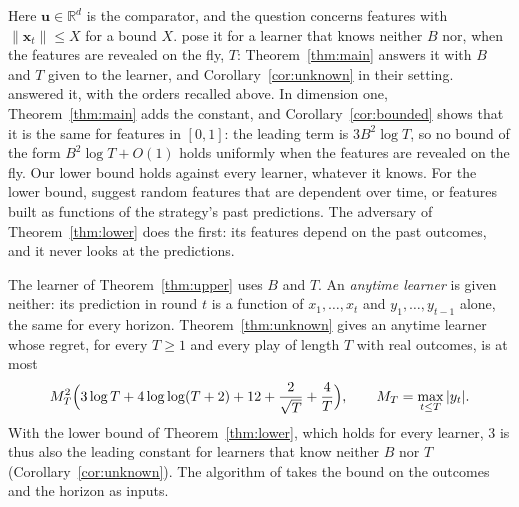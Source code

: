 \documentclass[12pt]{amsart}
\theoremstyle{definition}
\numberwithin{equation}{section}
\newcommand{\R}{\mathbb{R}}
\begin{document}
Here $\mathbf u\in\R^d$ is the comparator, and the question concerns features with $\|\mathbf x_t\|\le X$ for a bound $X$. \citet[Figure~1]{GaillardALT19} pose it for a learner that knows neither $B$ nor, when the features are revealed on the fly, $T$: Theorem~\ref{thm:main} answers it with $B$ and $T$ given to the learner, and Corollary~\ref{cor:unknown} in their setting. \citet[Theorem~5, Proposition~6 and Theorem~7]{CQRZ} answered it, with the orders recalled above. In dimension one, Theorem~\ref{thm:main} adds the constant, and Corollary~\ref{cor:bounded} shows that it is the same for features in $[0,1]$: the leading term is $3B^2\log T$, so no bound of the form $B^2\log T+O(1)$ holds uniformly when the features are revealed on the fly. Our lower bound holds against every learner, whatever it knows. For the lower bound, \citet[Section~4.1]{GaillardALT19} suggest random features that are dependent over time, or features built as functions of the strategy's past predictions. The adversary of Theorem~\ref{thm:lower} does the first: its features depend on the past outcomes, and it never looks at the predictions.

The learner of Theorem~\ref{thm:upper} uses $B$ and $T$. An \emph{anytime learner} is given neither: its prediction in round $t$ is a function of $x_1,\dots,x_t$ and $y_1,\dots,y_{t-1}$ alone, the same for every horizon. Theorem~\ref{thm:unknown} gives an anytime learner whose regret, for every $T\ge1$ and every play of length $T$ with real outcomes, is at most
\[
M_T^2\Bigl(3\log T+4\log\log(T+2)+12+\frac2{\sqrt T}+\frac4T\Bigr),\qquad M_T=\max_{t\le T}|y_t| .
\]
With the lower bound of Theorem~\ref{thm:lower}, which holds for every learner, $3$ is thus also the leading constant for learners that know neither $B$ nor $T$ (Corollary~\ref{cor:unknown}). The algorithm of \citet[Theorem~5]{CQRZ} takes the bound on the outcomes and the horizon as inputs.
\end{document}
